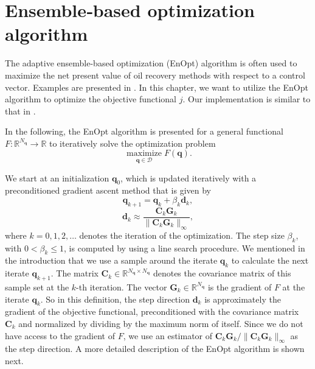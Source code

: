 \chapter{\label{ChapterEnsembleBasedOptimizationAlgorithm}Ensemble‑based optimization algorithm}

The adaptive ensemble-based optimization (EnOpt) algorithm is often used to maximize the net present value of oil recovery methods with respect to a control vector. Examples are presented in \cite{Keil2022-dj, OGUNTOLA2021109165, Zhang2023-sg}. In this chapter, we want to utilize the EnOpt algorithm to optimize the objective functional $j$. Our implementation is similar to that in \cite{Keil2022-dj}.

In the following, the EnOpt algorithm is presented for a general functional $F:\mathbb{R}^{N_\mathbf{q}}\to \mathbb{R}$ to iteratively solve the optimization problem
\begin{displaymath}
\operatorname*{maximize}_{\mathbf{q}\in\mathcal{D}}F(\mathbf{q}).
\end{displaymath}

We start at an initialization $\mathbf{q}_0$,  which is updated iteratively with a preconditioned gradient ascent method that is given by
\begin{displaymath}
\mathbf{q}_{k+1} = \mathbf{q}_k+\beta_k\mathbf{d}_k,
\end{displaymath}
\begin{displaymath}
\mathbf{d}_k\approx\frac{\mathbf{C}_k\mathbf{G}_k}{\|\mathbf{C}_k\mathbf{G}_k\|_\infty},
\end{displaymath}
where $k=0,1,2,\dotsc$ denotes the iteration of the optimization. The step size $\beta_k$, with $0<\beta_k\leq1$, is computed by using a line search procedure. We mentioned in the introduction that we use a sample around the iterate $\mathbf{q}_k$ to calculate the next iterate $\mathbf{q}_{k+1}$. The matrix $\mathbf{C}_k\in\mathbb{R}^{N_\mathbf{q}\times N_\mathbf{q}}$ denotes the covariance matrix of this sample set at the $k$-th iteration. The vector $\mathbf{G}_k\in\mathbb{R}^{N_\mathbf{q}}$ is the gradient of $F$ at the iterate $\mathbf{q}_k$. So in this definition, the step direction $\mathbf{d}_k$ is approximately the gradient of the objective functional, preconditioned with the covariance matrix $\mathbf{C}_k$ and normalized by dividing by the maximum norm of itself. Since we do not have access to the gradient of $F$, we use an estimator of $\mathbf{C}_k\mathbf{G}_k/\|\mathbf{C}_k\mathbf{G}_k\|_\infty$ as the step direction. A more detailed description of the EnOpt algorithm is shown next.\\

